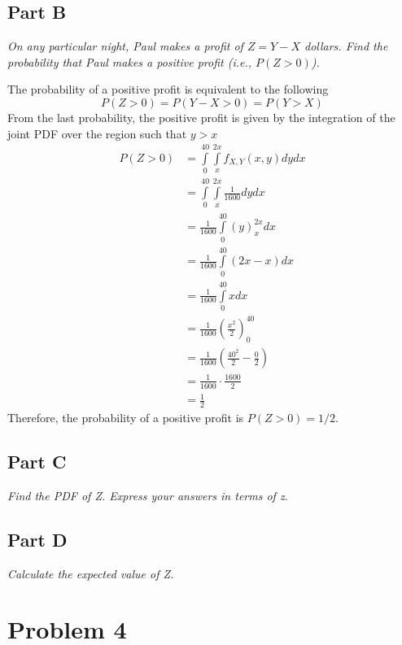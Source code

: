 \documentclass{article}
\begin{document}
\subsection*{Part B}

\textit{On any particular night, Paul makes a profit of $ Z = Y - X $ dollars.
Find the probability that Paul makes a positive profit (i.e., $ P(Z > 0)$). }

\bigbreak

The probability of a positive profit is equivalent to the following
$$ P(Z > 0) = P(Y - X > 0) = P(Y > X) $$
From the last probability, the positive profit is given by the integration of
the joint PDF over the region such that $ y > x $
\begin{align*}
    P(Z > 0) &= \int\limits_0^{40} \int\limits_x^{2x} f_{X,Y}(x, y) dy dx \\
    &= \int\limits_0^{40} \int\limits_x^{2x} \frac{1}{1600} dy dx \\
    &= \frac{1}{1600} \int\limits_0^{40} \left( y \right)_x^{2x} dx \\
    &= \frac{1}{1600} \int\limits_0^{40} \left( 2x - x \right) dx \\
    &= \frac{1}{1600} \int\limits_0^{40} x dx \\
    &= \frac{1}{1600} \left( \frac{x^2}{2} \right)_0^{40} \\
    &= \frac{1}{1600} \left( \frac{40^2}{2} - \frac{0}{2} \right) \\
    &= \frac{1}{1600} \cdot \frac{1600}{2} \\
    &= \frac{1}{2}
\end{align*}
Therefore, the probability of a positive profit is $ P(Z > 0) = 1/2 $.

\subsection*{Part C}

\textit{Find the PDF of Z. Express your answers in terms of z.}

\subsection*{Part D}

\textit{Calculate the expected value of Z.}

\section*{Problem 4}
\end{document}
